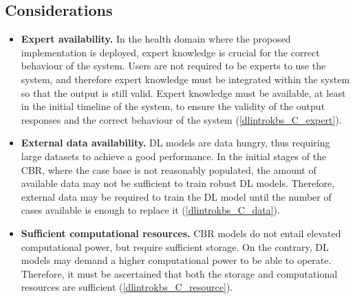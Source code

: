\subsection{Considerations}
\begin{itemize}
    \item \textbf{Expert availability.} In the health domain where the proposed implementation is deployed, expert knowledge is crucial for the correct behaviour of the system. Users are not required to be experts to use the system, and therefore expert knowledge must be integrated within the system so that the output is still valid. Expert knowledge must be available, at least in the initial timeline of the system, to ensure the validity of the output responses and the correct behaviour of the system (\ref{dlintrokbs_C_expert}).
    
    \item \textbf{External data availability.} DL models are data hungry, thus requiring large datasets to achieve a good performance. In the initial stages of the CBR, where the case base is not reasonably populated, the amount of available data may not be sufficient to train robust DL models. Therefore, external data may be required to train the DL model until the number of cases available is enough to replace it (\ref{dlintrokbs_C_data}).
    
    \item \textbf{Sufficient computational resources.} CBR models do not entail elevated computational power, but require sufficient storage. On the contrary, DL models may demand a higher computational power to be able to operate. Therefore, it must be ascertained that both the storage and computational resources are sufficient (\ref{dlintrokbs_C_resource}).
    
\end{itemize}
